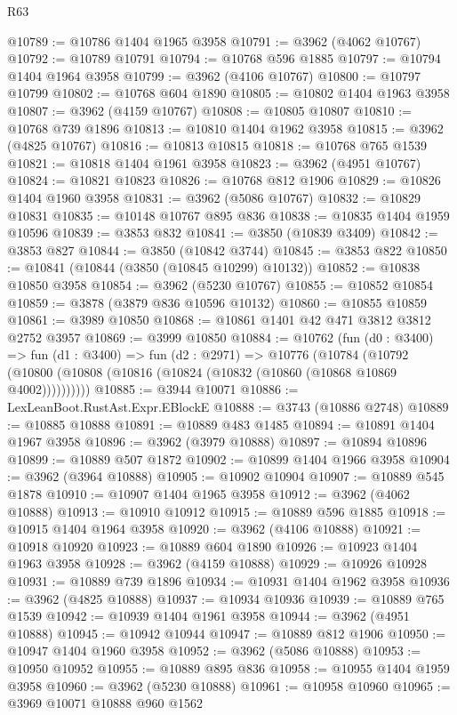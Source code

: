 \begin{lexlean}{R63}
\begin{coremodule}
@10789 := @10786 @1404 @1965 @3958
@10791 := @3962 (@4062 @10767)
@10792 := @10789 @10791
@10794 := @10768 @596 @1885
@10797 := @10794 @1404 @1964 @3958
@10799 := @3962 (@4106 @10767)
@10800 := @10797 @10799
@10802 := @10768 @604 @1890
@10805 := @10802 @1404 @1963 @3958
@10807 := @3962 (@4159 @10767)
@10808 := @10805 @10807
@10810 := @10768 @739 @1896
@10813 := @10810 @1404 @1962 @3958
@10815 := @3962 (@4825 @10767)
@10816 := @10813 @10815
@10818 := @10768 @765 @1539
@10821 := @10818 @1404 @1961 @3958
@10823 := @3962 (@4951 @10767)
@10824 := @10821 @10823
@10826 := @10768 @812 @1906
@10829 := @10826 @1404 @1960 @3958
@10831 := @3962 (@5086 @10767)
@10832 := @10829 @10831
@10835 := @10148 @10767 @895 @836
@10838 := @10835 @1404 @1959 @10596
@10839 := @3853 @832
@10841 := @3850 (@10839 @3409)
@10842 := @3853 @827
@10844 := @3850 (@10842 @3744)
@10845 := @3853 @822
@10850 := @10841 (@10844 (@3850 (@10845 @10299) @10132))
@10852 := @10838 @10850 @3958
@10854 := @3962 (@5230 @10767)
@10855 := @10852 @10854
@10859 := @3878 (@3879 @836 @10596 @10132)
@10860 := @10855 @10859
@10861 := @3989 @10850
@10868 := @10861 @1401 @42 @471 @3812 @3812 @2752 @3957
@10869 := @3999 @10850
@10884 := @10762
    (fun (d0 : @3400) =>
    fun (d1 : @3400) =>
    fun (d2 : @2971) =>
    @10776
      (@10784 (@10792 (@10800 (@10808 (@10816 (@10824 (@10832 (@10860 (@10868 @10869 @4002))))))))))
@10885 := @3944 @10071
@10886 := LexLeanBoot.RustAst.Expr.EBlockE
@10888 := @3743 (@10886 @2748)
@10889 := @10885 @10888
@10891 := @10889 @483 @1485
@10894 := @10891 @1404 @1967 @3958
@10896 := @3962 (@3979 @10888)
@10897 := @10894 @10896
@10899 := @10889 @507 @1872
@10902 := @10899 @1404 @1966 @3958
@10904 := @3962 (@3964 @10888)
@10905 := @10902 @10904
@10907 := @10889 @545 @1878
@10910 := @10907 @1404 @1965 @3958
@10912 := @3962 (@4062 @10888)
@10913 := @10910 @10912
@10915 := @10889 @596 @1885
@10918 := @10915 @1404 @1964 @3958
@10920 := @3962 (@4106 @10888)
@10921 := @10918 @10920
@10923 := @10889 @604 @1890
@10926 := @10923 @1404 @1963 @3958
@10928 := @3962 (@4159 @10888)
@10929 := @10926 @10928
@10931 := @10889 @739 @1896
@10934 := @10931 @1404 @1962 @3958
@10936 := @3962 (@4825 @10888)
@10937 := @10934 @10936
@10939 := @10889 @765 @1539
@10942 := @10939 @1404 @1961 @3958
@10944 := @3962 (@4951 @10888)
@10945 := @10942 @10944
@10947 := @10889 @812 @1906
@10950 := @10947 @1404 @1960 @3958
@10952 := @3962 (@5086 @10888)
@10953 := @10950 @10952
@10955 := @10889 @895 @836
@10958 := @10955 @1404 @1959 @3958
@10960 := @3962 (@5230 @10888)
@10961 := @10958 @10960
@10965 := @3969 @10071 @10888 @960 @1562

\end{coremodule}
\end{lexlean}
